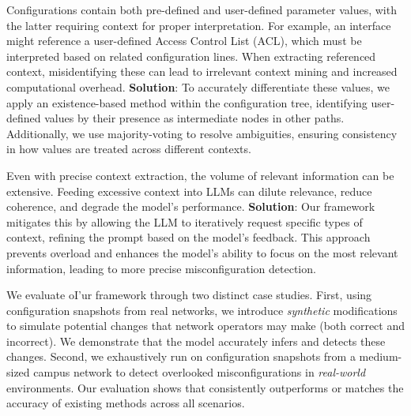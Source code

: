 Configurations contain both pre-defined and user-defined parameter values, with the latter requiring context for proper interpretation. For example, an interface might reference a user-defined Access Control List (ACL), which must be interpreted based on related configuration lines. When extracting referenced context, misidentifying these can lead to irrelevant context mining and increased computational overhead. \textbf{Solution}: To accurately differentiate these values, we apply an existence-based method within the configuration tree, identifying user-defined values by their presence as intermediate nodes in other paths. Additionally, we use majority-voting to resolve ambiguities, ensuring consistency in how values are treated across different contexts.

Even with precise context extraction, the volume of relevant information can be extensive. 
Feeding excessive context into LLMs can dilute relevance, reduce coherence, and degrade the model’s performance.
\textbf{Solution}: Our framework mitigates this by allowing the LLM to iteratively request specific types of context, refining the prompt based on the model’s feedback. This approach prevents overload and enhances the model’s ability to focus on the most relevant information, leading to more precise misconfiguration detection.

We evaluate oI'ur framework through two distinct case studies.
First, using configuration snapshots from real networks, we introduce {\em synthetic} modifications to simulate potential changes that network operators may make (both correct and incorrect). We demonstrate that the model accurately infers and detects these changes. 
Second, we exhaustively run \sysname{} on configuration snapshots from a medium-sized campus network to detect overlooked misconfigurations in {\em real-world} environments. Our evaluation shows that \sysname{} consistently outperforms or matches the accuracy of existing methods across all scenarios.